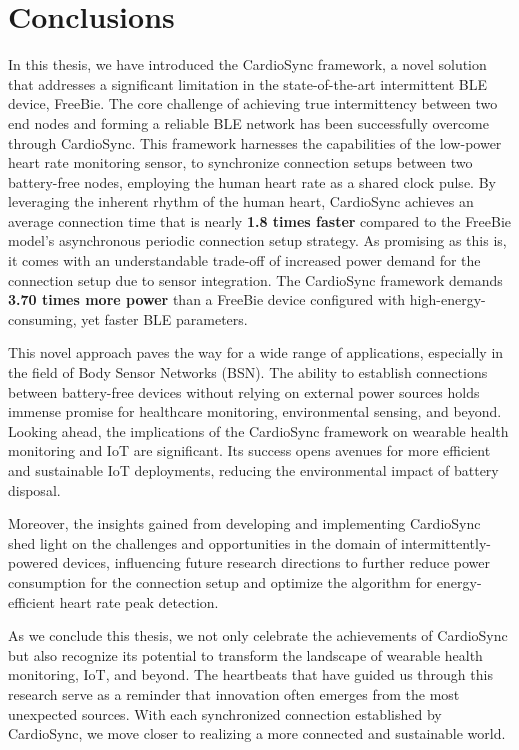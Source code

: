 \chapter{Conclusions}
\label{chp:conclusions}

In this thesis, we have introduced the CardioSync framework, a novel solution that addresses a significant limitation in the state-of-the-art intermittent BLE device, FreeBie. The core challenge of achieving true intermittency between two end nodes and forming a reliable BLE network has been successfully overcome through CardioSync. This framework harnesses the capabilities of the low-power heart rate monitoring sensor, to synchronize connection setups between two battery-free nodes, employing the human heart rate as a shared clock pulse. By leveraging the inherent rhythm of the human heart, CardioSync achieves an average connection time that is nearly \textbf{1.8 times faster} compared to the FreeBie model's asynchronous periodic connection setup strategy. As promising as this is, it comes with an understandable trade-off of increased power demand for the connection setup due to sensor integration. The CardioSync framework demands \textbf{3.70 times more power} than a FreeBie device configured with high-energy-consuming, yet faster BLE parameters.
\vspace{1\baselineskip}

\noindent This novel approach paves the way for a wide range of applications, especially in the field of Body Sensor Networks (BSN). The ability to establish connections between battery-free devices without relying on external power sources holds immense promise for healthcare monitoring, environmental sensing, and beyond. Looking ahead, the implications of the CardioSync framework on wearable health monitoring and IoT are significant. Its success opens avenues for more efficient and sustainable IoT deployments, reducing the environmental impact of battery disposal.
\vspace{1\baselineskip}

\noindent Moreover, the insights gained from developing and implementing CardioSync shed light on the challenges and opportunities in the domain of intermittently-powered devices, influencing future research directions to further reduce power consumption for the connection setup and optimize the algorithm for energy-efficient heart rate peak detection.
\vspace{1\baselineskip}

\noindent As we conclude this thesis, we not only celebrate the achievements of CardioSync but also recognize its potential to transform the landscape of wearable health monitoring, IoT, and beyond. The heartbeats that have guided us through this research serve as a reminder that innovation often emerges from the most unexpected sources. With each synchronized connection established by CardioSync, we move closer to realizing a more connected and sustainable world.
